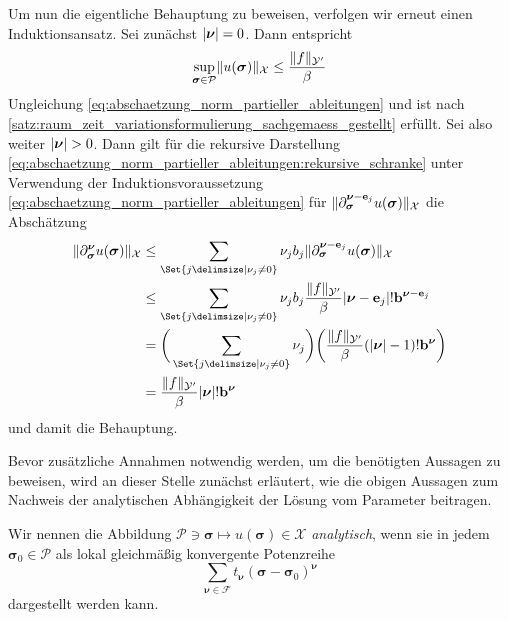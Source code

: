\documentclass[../main.tex]{subfiles}
\begin{document}
\begin{Satz}
\begin{Beweis}
        Um nun die eigentliche Behauptung zu beweisen, verfolgen wir erneut einen Induktionsansatz.
        Sei zunächst $\lvert\bm\nu\rvert = 0$.
        Dann entspricht
        \begin{equation}
            \sup_{\bm \sigma \in \mathcal P} \lVert u(\bm\sigma)\rVert_{\mathcal X} \leq \frac{\lVert f\rVert_{\mathcal Y'}}{\beta}
        \end{equation}
        Ungleichung \cref{eq:abschaetzung_norm_partieller_ableitungen} und ist nach \cref{satz:raum_zeit_variationsformulierung_sachgemaess_gestellt} erfüllt.
        Sei also weiter $\lvert\bm\nu\rvert > 0$.
        Dann gilt für die rekursive Darstellung \cref{eq:abschaetzung_norm_partieller_ableitungen:rekursive_schranke} unter Verwendung der Induktionsvoraussetzung \cref{eq:abschaetzung_norm_partieller_ableitungen} für $\lVert\partial^{\bm\nu - \mathbf{e}_{j}}_{\bm\sigma} u(\bm\sigma)\rVert_{\mathcal X}$ die Abschätzung
        \begin{align}
            \norm{\partial^{\bm\nu}_{\bm\sigma} u(\bm\sigma)}_{\mathcal X}
            &\leq
            \sum_{\Set{j \given \nu_{j} \neq 0}} \nu_{j} b_{j} \norm{\partial^{\bm\nu - \vec e_{j}}_{\bm\sigma} u(\bm\sigma)}_{\mathcal X}
            \\&\leq
            \sum_{\Set{j \given \nu_{j} \neq 0}} \nu_{j} b_{j} \frac{\norm{f}_{\mathcal Y'}}{\beta} \abs{\bm\nu - \vec e_{j}}! \vec b^{\bm\nu - \vec e_{j}}
            \\&=
            \bigg( \sum_{\Set{j \given \nu_{j} \neq 0}} \nu_{j} \bigg) \bigg( \frac{\norm{f}_{\mathcal Y'}}{\beta} (\abs{\bm\nu} - 1)! \vec b^{\bm\nu} \bigg)
            \\&=
            \frac{\norm{f}_{\mathcal Y'}}{\beta} \abs{\bm\nu}! \vec b^{\bm\nu}
         \end{align}
         und damit die Behauptung.
    \end{Beweis}
\end{Satz}

Bevor zusätzliche Annahmen notwendig werden, um die benötigten Aussagen zu beweisen, wird an dieser Stelle zunächst erläutert, wie die obigen Aussagen zum Nachweis der analytischen Abhängigkeit der Lösung vom Parameter beitragen.

\begin{Definition}
\label{definition:analytisch}
    Wir nennen die Abbildung $\mathcal P \ni \bm \sigma \mapsto u(\bm \sigma) \in \mathcal X$ \emph{analytisch}, wenn sie in jedem $\bm\sigma_{0} \in \mathcal P$ als lokal gleichmäßig konvergente Potenzreihe
    \begin{equation}
        \sum_{\bm \nu \in \mathcal F} t_{\bm \nu} (\bm \sigma - \bm \sigma_{0})^{\bm \nu}
    \end{equation}
    dargestellt werden kann.
\end{Definition}
\end{document}

